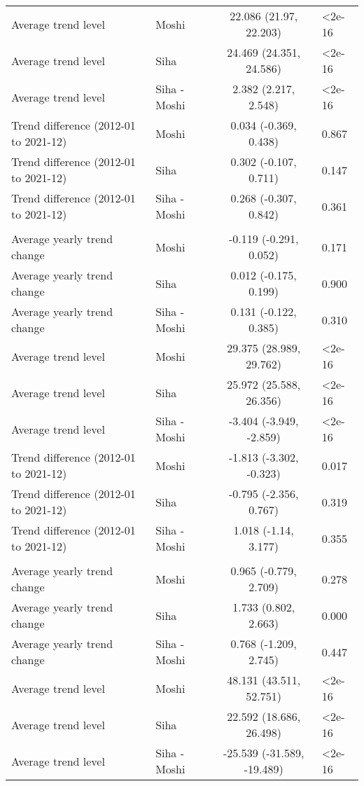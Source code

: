 \begin{longtable}{l|lcl}
Average trend level & Moshi & 22.086 (21.97, 22.203) & <2e-16 \\ 
Average trend level & Siha & 24.469 (24.351, 24.586) & <2e-16 \\ 
Average trend level & Siha - Moshi & 2.382 (2.217, 2.548) & <2e-16 \\ 
Trend difference (2012-01 to 2021-12) & Moshi & 0.034 (-0.369, 0.438) & 0.867 \\ 
Trend difference (2012-01 to 2021-12) & Siha & 0.302 (-0.107, 0.711) & 0.147 \\ 
Trend difference (2012-01 to 2021-12) & Siha - Moshi & 0.268 (-0.307, 0.842) & 0.361 \\ 
\midrule\addlinespace[2.5pt]
\multicolumn{4}{l}{UTCI} \\ 
\midrule\addlinespace[2.5pt]
Average yearly trend change & Moshi & -0.119 (-0.291, 0.052) & 0.171 \\ 
Average yearly trend change & Siha & 0.012 (-0.175, 0.199) & 0.900 \\ 
Average yearly trend change & Siha - Moshi & 0.131 (-0.122, 0.385) & 0.310 \\ 
Average trend level & Moshi & 29.375 (28.989, 29.762) & <2e-16 \\ 
Average trend level & Siha & 25.972 (25.588, 26.356) & <2e-16 \\ 
Average trend level & Siha - Moshi & -3.404 (-3.949, -2.859) & <2e-16 \\ 
Trend difference (2012-01 to 2021-12) & Moshi & -1.813 (-3.302, -0.323) & 0.017 \\ 
Trend difference (2012-01 to 2021-12) & Siha & -0.795 (-2.356, 0.767) & 0.319 \\ 
Trend difference (2012-01 to 2021-12) & Siha - Moshi & 1.018 (-1.14, 3.177) & 0.355 \\ 
\midrule\addlinespace[2.5pt]
\multicolumn{4}{l}{Rainfall} \\ 
\midrule\addlinespace[2.5pt]
Average yearly trend change & Moshi & 0.965 (-0.779, 2.709) & 0.278 \\ 
Average yearly trend change & Siha & 1.733 (0.802, 2.663) & 0.000 \\ 
Average yearly trend change & Siha - Moshi & 0.768 (-1.209, 2.745) & 0.447 \\ 
Average trend level & Moshi & 48.131 (43.511, 52.751) & <2e-16 \\ 
Average trend level & Siha & 22.592 (18.686, 26.498) & <2e-16 \\ 
Average trend level & Siha - Moshi & -25.539 (-31.589, -19.489) & <2e-16 \\ 

\end{longtable}
